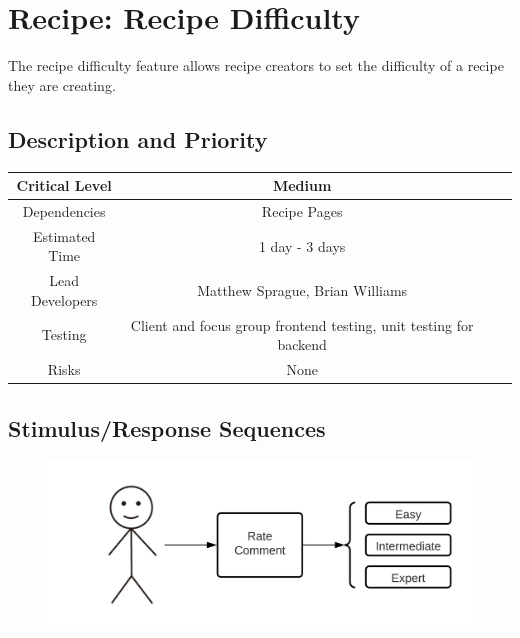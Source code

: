 \documentclass{scrreprt}
\begin{document}
\section{Recipe: Recipe Difficulty}

The recipe difficulty feature allows recipe creators to set the difficulty of a recipe they are creating.

\subsection{Description and Priority}
\begin{center}
    \begin{tabular}{| c | c | c | c |}
        \hline
        Critical Level  & Medium                                                            \\
        \hline
        Dependencies    & Recipe Pages                                                      \\
        \hline
        Estimated Time  & 1 day - 3 days                                                    \\
        \hline
        Lead Developers & Matthew Sprague, Brian Williams                                   \\
        \hline
        Testing         & Client and focus group frontend testing, unit testing for backend \\
        \hline
        Risks           & None                                                              \\
        \hline
    \end{tabular}
\end{center}

\subsection{Stimulus/Response Sequences}

\begin{figure}[H]\centering
    \includegraphics[width=\columnwidth]{FlowCharts/Recipe-Difficulty.png}
\end{figure}
\end{document}
